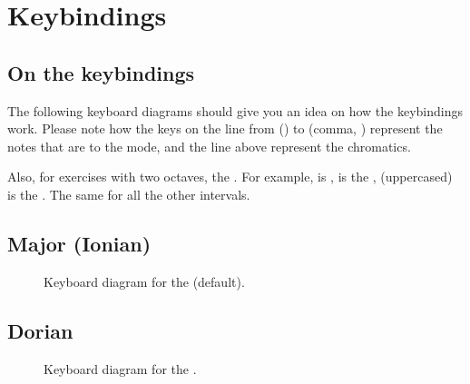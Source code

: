 \documentclass[letterpaper,10pt,english]{sphinxmanual}
\begin{document}
\section{Keybindings}
\label{\detokenize{using:keybindings}}

\subsection{On the keybindings}
\label{\detokenize{using:on-the-keybindings}}
\sphinxAtStartPar
The following keyboard diagrams should give you an idea on how the
keybindings work. Please note how the keys on the line from 
() to \sphinxcode{\sphinxupquote{,}} (comma, ) represent the notes that are
 to the mode, and the line above represent the chromatics.

\sphinxAtStartPar
Also, for exercises with two octaves, the . For example,  is , \sphinxcode{\sphinxupquote{,}} is the
,  (uppercased) is the . The same for all the other
intervals.


\subsection{Major (Ionian)}
\label{\detokenize{using:major-ionian}}
\begin{figure}[htbp]
\centering
\capstart

\noindent{}
\caption{Keyboard diagram for the  (default).}\label{\detokenize{using:id1}}\end{figure}


\subsection{Dorian}
\label{\detokenize{using:dorian}}
\begin{figure}[htbp]
\centering
\capstart

\noindent{}
\caption{Keyboard diagram for the .}\label{\detokenize{using:id2}}\end{figure}
\end{document}

